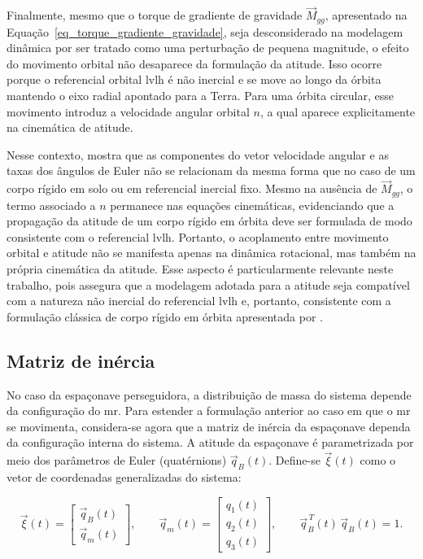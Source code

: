 Finalmente, mesmo que o torque de gradiente de gravidade $\vec{M}_{gg}$, apresentado na Equação~\ref{eq_torque_gradiente_gravidade}, seja desconsiderado na modelagem dinâmica por ser tratado como uma perturbação de pequena magnitude, o efeito do movimento orbital não desaparece da formulação da atitude.
Isso ocorre porque o referencial orbital \gls{lvlh} é não inercial e se move ao longo da órbita mantendo o eixo radial apontado para a Terra. Para uma órbita circular, esse movimento introduz a velocidade angular orbital $n$, a qual aparece explicitamente na cinemática de atitude.

Nesse contexto, \cite{wie2008space} mostra que as componentes do vetor velocidade angular e as taxas dos ângulos de Euler não se relacionam da mesma forma que no caso de um corpo rígido em solo ou em referencial inercial fixo.
Mesmo na ausência de $\vec{M}_{gg}$, o termo associado a $n$ permanece nas equações cinemáticas, evidenciando que a propagação da atitude de um corpo rígido em órbita deve ser formulada de modo consistente com o referencial \gls{lvlh}. Portanto, o acoplamento entre movimento orbital e atitude não se manifesta apenas na dinâmica rotacional, mas também na própria cinemática da atitude.
Esse aspecto é particularmente relevante neste trabalho, pois assegura que a modelagem adotada para a atitude seja compatível com a natureza não inercial do referencial \gls{lvlh} e, portanto, consistente com a formulação clássica de corpo rígido em órbita apresentada por \cite{wie2008space}.

\subsection{Matriz de inércia}
\label{sec_matriz_inercia_variavel}

No caso da espaçonave perseguidora, a distribuição de massa do sistema depende da configuração do \gls{mr}. Para estender a formulação anterior ao caso em que o \gls{mr} se movimenta, considera-se agora que a matriz de inércia da espaçonave dependa da configuração interna do sistema. A atitude da espaçonave é parametrizada por meio dos parâmetros de Euler (quatérnions) $\vec{q}_B(t)$.
Define-se $\vec{\xi}(t)$ como o vetor de coordenadas generalizadas do sistema:

\begin{equation}
\vec{\xi}(t) =
\begin{bmatrix}
\vec{q}_B(t) \\
\vec{q}_m(t)
\end{bmatrix},
\qquad
\vec{q}_m(t) =
\begin{bmatrix}
q_1(t) \\ q_2(t) \\ q_3(t)
\end{bmatrix},
\qquad
\vec{q}_B^{\,T}(t)\,\vec{q}_B(t)=1.
\end{equation}


